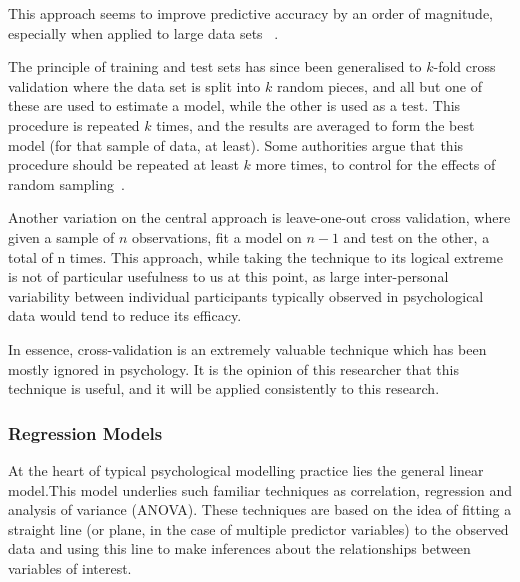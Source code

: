 This approach seems to improve predictive accuracy by an order of  magnitude, especially when applied to large data sets ~\cite{breiman2001statistical}.  

The principle of training and test sets has since been generalised to $k$-fold cross validation where the data set is split into $k$ random pieces, and all but one of these are used to estimate a model, while the other is used as a test. This procedure is repeated $k$ times, and the results are averaged to form the best model (for that sample of data, at least). Some authorities argue that this procedure should be repeated at least $k$ more times, to control for the effects of random sampling~\cite{friedman2009elements}.

Another variation on the central approach is leave-one-out cross validation, where given a sample of $n$ observations, fit a model on $n-1$ and test on the other, a total of n times. This approach, while taking the technique to its logical extreme is not of particular usefulness to us at this point, as large inter-personal variability between individual participants typically observed in psychological data would tend to reduce its efficacy\cite{friedman2009elements}. %

In essence, cross-validation is an extremely valuable technique which has been mostly ignored in psychology. It is the opinion of this researcher  that this technique is useful, and it will be applied consistently to this research.

\subsubsection{Regression Models}
\label{sec:regress-models}

At the heart of typical psychological modelling practice lies the general linear model.This model underlies such familiar techniques as correlation, regression and analysis of variance (ANOVA)\cite{gelman2007data}. These techniques are based on the idea of fitting a straight line (or plane, in the case of multiple predictor variables) to the observed data and using this line to make inferences about the relationships between variables of interest.


